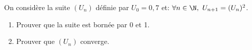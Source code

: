 \begin{exercice}

 On consid\`ere la suite $(U_n)$ d\'efinie par $U_0=0,7$ et:
  $\forall n\in\N,\ U_{n+1}=(U_n)^2$. 
  \begin{enumerate}
  \item Prouver que la suite est born\'ee par 0 et 1.
  \item Prouver que $(U_n)$ converge.
  \end{enumerate}
\end{exercice}
